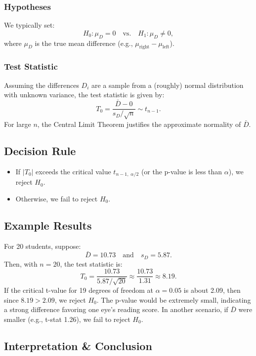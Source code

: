\documentclass[10pt, total={6in, 8in}]{extarticle}
\begin{document}
\subsubsection{Hypotheses}
We typically set:
$$H_0: \mu_D = 0 \quad \text{vs.} \quad H_1: \mu_D \neq 0,$$
where $\mu_D$ is the true mean difference (e.g., $\mu_{\text{right}} - \mu_{\text{left}}$).

\subsubsection{Test Statistic}
Assuming the differences $D_i$ are a sample from a (roughly) normal distribution with unknown variance, the test statistic is given by:
$$T_0 = \frac{\bar{D} - 0}{s_D / \sqrt{n}} \sim t_{n-1}.$$
For large $n$, the Central Limit Theorem justifies the approximate normality of $\bar{D}$.

\subsection{Decision Rule}
\begin{itemize}
    \item If $|T_0|$ exceeds the critical value $t_{n-1,\;\alpha/2}$ (or the p-value is less than $\alpha$), we reject $H_0$.
    \item Otherwise, we fail to reject $H_0$.
\end{itemize}

\subsection{Example Results}
\begin{examplebox}{}{}
    For 20 students, suppose:
    $$\bar{D} = 10.73 \quad \text{and} \quad s_D = 5.87.$$
    Then, with $n = 20$, the test statistic is:
    $$T_0 = \frac{10.73}{5.87/\sqrt{20}} \approx \frac{10.73}{1.31} \approx 8.19.$$
    If the critical t-value for 19 degrees of freedom at $\alpha = 0.05$ is about 2.09, then since $8.19 > 2.09$, we reject $H_0$. The p-value would be extremely small, indicating a strong difference favoring one eye's reading score. In another scenario, if $\bar{D}$ were smaller (e.g., t-stat 1.26), we fail to reject $H_0$.
\end{examplebox}

\subsection{Interpretation \& Conclusion}
\end{document}
